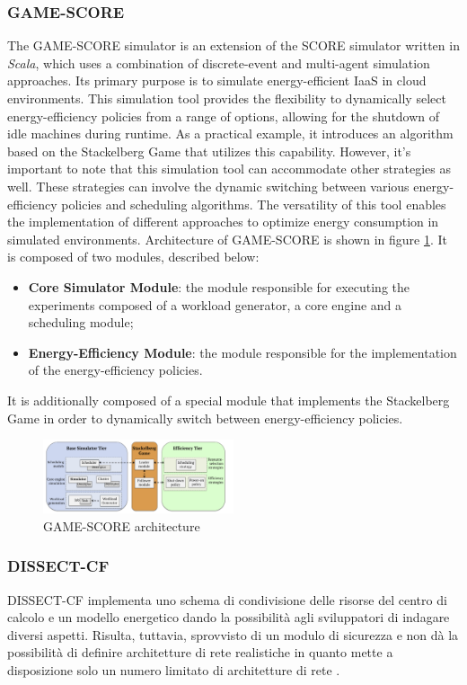 {\subsubsection*{GAME-SCORE}
The GAME-SCORE simulator is an extension of the SCORE simulator written in \emph{Scala}, which uses a combination of discrete-event and multi-agent simulation approaches. Its primary purpose is to simulate energy-efficient IaaS in cloud environments. This simulation tool provides the flexibility to dynamically select energy-efficiency policies from a range of options, allowing for the shutdown of idle machines during runtime. As a practical example, it introduces an algorithm based on the Stackelberg Game that utilizes this capability. However, it's important to note that this simulation tool can accommodate other strategies as well. These strategies can involve the dynamic switching between various energy-efficiency policies and scheduling algorithms. The versatility of this tool enables the implementation of different approaches to optimize energy consumption in simulated environments.
Architecture of GAME-SCORE is shown in figure \ref{fig:gamescore_arch}. It is composed of two modules, described below:
\begin{itemize}
    \item \textbf{Core Simulator Module}: the module responsible for executing the experiments composed of a workload generator, a core engine and a scheduling module;
    \item \textbf{Energy-Efficiency Module}: the module responsible for the implementation of the energy-efficiency policies.
\end{itemize}
It is additionally composed of a special module that implements the Stackelberg Game in order to dynamically switch between energy-efficiency policies. 
\begin{figure}[h]
    \centering
    \includegraphics[width=0.5\textwidth]{capitoli/images/gamescore_arch.png}
    \caption{GAME-SCORE architecture}
    \label{fig:gamescore_arch}
\end{figure}
\subsubsection*{DISSECT-CF}
DISSECT-CF \cite{kecskemeti2015dissect} implementa uno schema di condivisione delle risorse del centro di calcolo e un modello energetico dando la possibilità agli sviluppatori di indagare diversi aspetti. Risulta, tuttavia, sprovvisto di un modulo di sicurezza e non dà la possibilità di definire architetture di rete realistiche in quanto mette a disposizione solo un numero limitato di architetture di rete \cite{mansouri2020cloud}.
}
